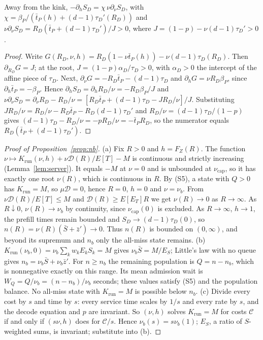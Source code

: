 \begin{lemma}\label{lem:rho}
Away from the kink, $-\partial_hS_D=\chi\,\nu\partial_\nu S_D$, with $\chi=\beta_P/(\bar t_P(h)+(d-1)\tau_D'(R_D))$ and $\nu\partial_\nu S_D=R_D(\bar t_P+(d-1)\tau_D')/J>0$, where $J=(1-p)-\nu(d-1)\tau_D'>0$.
\end{lemma}
\begin{proof}
Write $G(R_D,\nu,h)=R_D(1-\nu\bar t_P(h))-\nu(d-1)\tau_D(R_D)$. Then $\partial_{R_D}G=J$; at the root, $J=(1-p)\alpha_D/\tau_D>0$, with $\alpha_D>0$ the intercept of the affine piece of $\tau_D$. Next, $\partial_\nu G=-R_D\bar t_P-(d-1)\tau_D$ and $\partial_hG=\nu R_D\beta_P$, since $\partial_h\bar t_P=-\beta_P$. Hence $\partial_hS_D=\partial_hR_D/\nu=-R_D\beta_P/J$ and $\nu\partial_\nu S_D=\partial_\nu R_D-R_D/\nu=[R_D\bar t_P+(d-1)\tau_D-JR_D/\nu]/J$. Substituting $JR_D/\nu=R_D/\nu-R_D\bar t_P-R_D(d-1)\tau_D'$ and $R_D/\nu=(d-1)\tau_D/(1-p)$ gives $(d-1)\tau_D-R_D/\nu=-pR_D/\nu=-\bar t_PR_D$, so the numerator equals $R_D(\bar t_P+(d-1)\tau_D')$.
\end{proof}

\begin{proof}[Proof of Proposition~\ref{prop:nb}]
(a) Fix $R>0$ and $h=F_Z(R)$. The function $\nu\mapsto K_{\mathrm{run}}(\nu,h)+\nu\mathcal D(R)/E[T]-M$ is continuous and strictly increasing (Lemma~\ref{lem:server}). It equals $-M$ at $\nu=0$ and is unbounded at $\nu_{\mathrm{cap}}$, so it has exactly one root $\nu(R)$, which is continuous in $R$. By (S5), a state with $Q>0$ has $K_{\mathrm{run}}=M$, so $\mu\mathcal D=0$, hence $R=0$, $h=0$ and $\nu=\nu_b$. From $\nu\mathcal D(R)/E[T]\le M$ and $\mathcal D(R)\ge E[E_T]R$ we get $\nu(R)\to0$ as $R\to\infty$. As $R\downarrow0$, $\nu(R)\to\nu_b$ by continuity, since $\nu_{\mathrm{cap}}(0)$ is excluded. As $R\to\infty$, $h\to1$, the prefill times remain bounded and $S_D\to(d-1)\tau_D(0)$, so $n(R)=\nu(R)(\bar S+\bar z')\to0$. Thus $n(R)$ is bounded on $(0,\infty)$, and beyond its supremum and $n_b$ only the all-miss state remains.
(b) $K_{\mathrm{run}}(\nu_b,0)=\nu_b\sum_kw_kE_kS_k=M$ gives $\nu_b\bar S=M/E_S$; Little's law with no queue gives $n_b=\nu_b\bar S+\nu_b\bar z'$. For $n\ge n_b$ the remaining population is $Q=n-n_b$, which is nonnegative exactly on this range. Its mean admission wait is $W_Q=Q/\nu_b=(n-n_b)/\nu_b$ seconds; these values satisfy (S5) and the population balance. No all-miss state with $K_{\mathrm{run}}=M$ is possible below $n_b$.
(c) Divide every cost by $s$ and time by $s$: every service time scales by $1/s$ and every rate by $s$, and the decode equation and $p$ are invariant. So $(\nu,h)$ solves $K_{\mathrm{run}}=M$ for costs $\mathcal C$ if and only if $(s\nu,h)$ does for $\mathcal C/s$. Hence $\nu_b(s)=s\nu_b(1)$; $E_S$, a ratio of $S$-weighted sums, is invariant; substitute into (b).
\end{proof}

